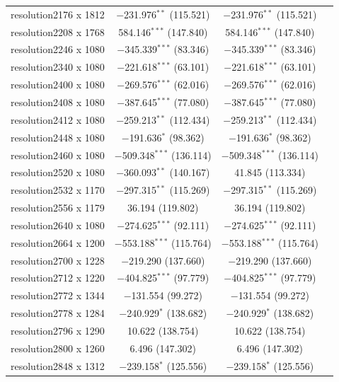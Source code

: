 \documentclass[
  12pt,
]{report}
\begin{document}
\begin{table}[!htbp]
\begin{tabular}{@{\extracolsep{5pt}}lccc}
  resolution2176 x 1812 & $-$231.976$^{**}$ (115.521) & $-$231.976$^{**}$ (115.521) &  \\ 
  resolution2208 x 1768 & 584.146$^{***}$ (147.840) & 584.146$^{***}$ (147.840) &  \\ 
  resolution2246 x 1080 & $-$345.339$^{***}$ (83.346) & $-$345.339$^{***}$ (83.346) &  \\ 
  resolution2340 x 1080 & $-$221.618$^{***}$ (63.101) & $-$221.618$^{***}$ (63.101) &  \\ 
  resolution2400 x 1080 & $-$269.576$^{***}$ (62.016) & $-$269.576$^{***}$ (62.016) &  \\ 
  resolution2408 x 1080 & $-$387.645$^{***}$ (77.080) & $-$387.645$^{***}$ (77.080) &  \\ 
  resolution2412 x 1080 & $-$259.213$^{**}$ (112.434) & $-$259.213$^{**}$ (112.434) &  \\ 
  resolution2448 x 1080 & $-$191.636$^{*}$ (98.362) & $-$191.636$^{*}$ (98.362) &  \\ 
  resolution2460 x 1080 & $-$509.348$^{***}$ (136.114) & $-$509.348$^{***}$ (136.114) &  \\ 
  resolution2520 x 1080 & $-$360.093$^{**}$ (140.167) & 41.845 (113.334) &  \\ 
  resolution2532 x 1170 & $-$297.315$^{**}$ (115.269) & $-$297.315$^{**}$ (115.269) &  \\ 
  resolution2556 x 1179 & 36.194 (119.802) & 36.194 (119.802) &  \\ 
  resolution2640 x 1080 & $-$274.625$^{***}$ (92.111) & $-$274.625$^{***}$ (92.111) &  \\ 
  resolution2664 x 1200 & $-$553.188$^{***}$ (115.764) & $-$553.188$^{***}$ (115.764) &  \\ 
  resolution2700 x 1228 & $-$219.290 (137.660) & $-$219.290 (137.660) &  \\ 
  resolution2712 x 1220 & $-$404.825$^{***}$ (97.779) & $-$404.825$^{***}$ (97.779) &  \\ 
  resolution2772 x 1344 & $-$131.554 (99.272) & $-$131.554 (99.272) &  \\ 
  resolution2778 x 1284 & $-$240.929$^{*}$ (138.682) & $-$240.929$^{*}$ (138.682) &  \\ 
  resolution2796 x 1290 & 10.622 (138.754) & 10.622 (138.754) &  \\ 
  resolution2800 x 1260 & 6.496 (147.302) & 6.496 (147.302) &  \\ 
  resolution2848 x 1312 & $-$239.158$^{*}$ (125.556) & $-$239.158$^{*}$ (125.556) &  \\ 

\end{tabular}
\end{table}
\end{document}
